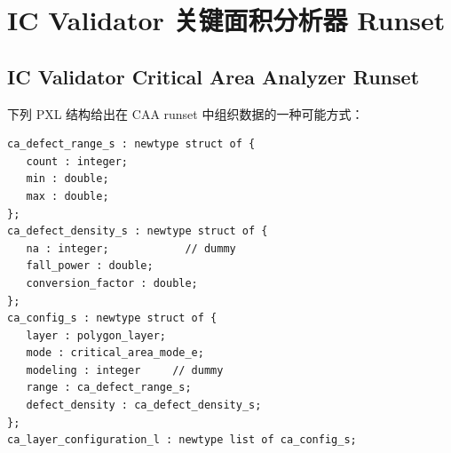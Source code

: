 
\section{IC Validator 关键面积分析器 Runset}
\subsection*{IC Validator Critical Area Analyzer Runset}

下列 PXL 结构给出在 CAA runset 中组织数据的一种可能方式：
\begin{lstlisting}[style=pxl]
ca_defect_range_s : newtype struct of {
   count : integer;
   min : double;
   max : double;
};
ca_defect_density_s : newtype struct of {
   na : integer;            // dummy
   fall_power : double;
   conversion_factor : double;
};
ca_config_s : newtype struct of {
   layer : polygon_layer;
   mode : critical_area_mode_e;
   modeling : integer     // dummy
   range : ca_defect_range_s;
   defect_density : ca_defect_density_s;
};
ca_layer_configuration_l : newtype list of ca_config_s;
\end{lstlisting}

